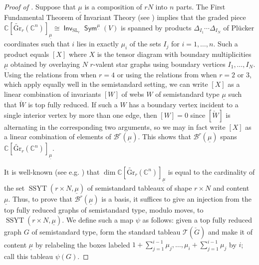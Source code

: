 \documentclass{amsart}
\theoremstyle{definition}
\theoremstyle{remark}
\numberwithin{equation}{section}
\DeclareMathOperator{\SL}{SL}
\DeclareMathOperator{\Inv}{\mathsf{Inv}}
\DeclareMathOperator{\Sym}{\mathsf{Sym}}
\DeclareMathOperator{\ssyt}{SSYT}
\begin{document}
\begin{proof}[Proof of ]
    Suppose that $\underline{\mu}$ is a composition of $rN$ into $n$ parts. The First Fundamental Theorem of Invariant Theory (see \cite{Weyl}) implies that the graded piece $\mathbb{C}[\widetilde{\mathrm{Gr}}_r(\mathbb{C}^n)]_{\underline{\mu}} \cong \Inv_{\SL_r} \Sym^{\underline{\mu}}(V)$ is spanned by products $\Delta_{I_1}\cdots \Delta_{I_N}$ of Pl\"{u}cker coordinates such that $i$ lies in exactly $\mu_i$ of the sets $I_j$ for $i=1,\ldots,n$. Such a product equals $[X]$ where $X$ is the tensor diagram with boundary multiplicities $\underline{\mu}$ obtained by overlaying $N$ $r$-valent star graphs using boundary vertices $I_1,\ldots,I_N$. Using the relations from  when $r=4$ or using the relations from \cite{Kuperberg} when $r=2$ or $3$, which apply equally well in the semistandard setting, we can write $[X]$ as a linear combination of invariants $[W]$ of webs $W$ of semistandard type $\underline{\mu}$ such that $\check{W}$ is top fully reduced. If such a $W$ has a boundary vertex incident to a single interior vertex by more than one edge, then $[W]=0$ since $[\check{W}]$ is alternating in the corresponding two arguments, so we may in fact write $[X]$ as a linear combination of elements of $\mathscr{B}^r(\underline{\mu})$. This shows that $\mathscr{B}^r(\underline{\mu})$ spans $\mathbb{C}[\widetilde{\mathrm{Gr}}_r(\mathbb{C}^n)]_{\underline{\mu}}$.
    
    It is well-known (see e.g. \cite[Ch.~1]{Seshadri}) that $\dim \mathbb{C}[\widetilde{\mathrm{Gr}}_r(\mathbb{C}^n)]_{\underline{\mu}}$ is equal to the cardinality of the set $\ssyt(r \times N, \underline{\mu})$ of semistandard tableaux of shape $r \times N$ and content $\underline{\mu}$. Thus, to prove that $\mathscr{B}^r(\underline{\mu})$ is a basis, it suffices to give an injection from the top fully reduced graphs of semistandard type, modulo moves, to $\ssyt(r \times N, \underline{\mu})$. We define such a map $\psi$ as follows: given a top fully reduced graph $G$ of semistandard type, form the standard tableau $\mathcal{T}(\check{G})$ and make it of content $\underline{\mu}$ by relabeling the boxes labeled $1+\sum_{j=1}^{i-1} \mu_j, \ldots, \mu_i + \sum_{j=1}^{i-1} \mu_j$ by $i$; call this tableau $\psi(G)$. 
    

\end{proof}
\end{document}
